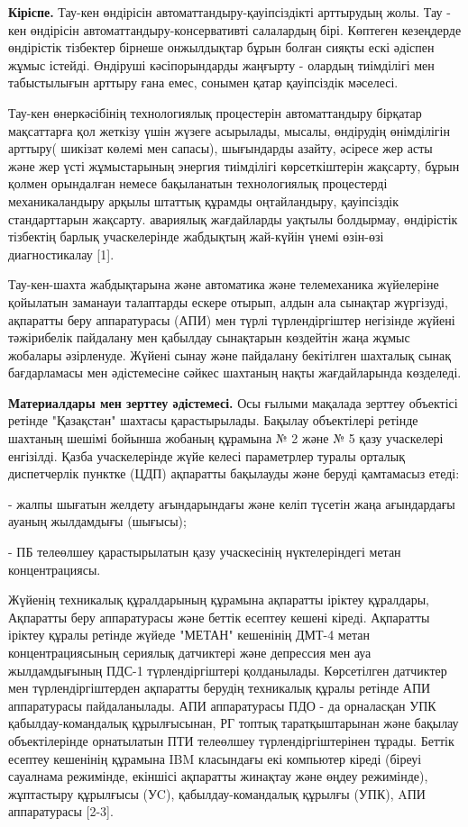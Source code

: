 \begin{multicols}{2}
{\bfseries Кіріспе.} Тау-кен өндірісін автоматтандыру-қауіпсіздікті
арттырудың жолы. Тау - кен өндірісін автоматтандыру-консервативті
салалардың бірі. Көптеген кезеңдерде өндірістік тізбектер бірнеше
онжылдықтар бұрын болған сияқты ескі әдіспен жұмыс істейді. Өндіруші
кәсіпорындарды жаңғырту - олардың тиімділігі мен табыстылығын арттыру
ғана емес, сонымен қатар қауіпсіздік мәселесі.

Тау-кен өнеркәсібінің технологиялық процестерін автоматтандыру бірқатар
мақсаттарға қол жеткізу үшін жүзеге асырылады, мысалы, өндірудің
өнімділігін арттыру( шикізат көлемі мен сапасы), шығындарды азайту,
әсіресе жер асты және жер үсті жұмыстарының энергия тиімділігі
көрсеткіштерін жақсарту, бұрын қолмен орындалған немесе бақыланатын
технологиялық процестерді механикаландыру арқылы штаттық құрамды
оңтайландыру, қауіпсіздік стандарттарын жақсарту. авариялық жағдайларды
уақтылы болдырмау, өндірістік тізбектің барлық учаскелерінде жабдықтың
жай-күйін үнемі өзін-өзі диагностикалау {[}1{]}.

Тау-кен-шахта жабдықтарына және автоматика және телемеханика жүйелеріне
қойылатын заманауи талаптарды ескере отырып, алдын ала сынақтар
жүргізуді, ақпаратты беру аппаратурасы (АПИ) мен түрлі түрлендіргіштер
негізінде жүйені тәжірибелік пайдалану мен қабылдау сынақтарын көздейтін
жаңа жұмыс жобалары әзірленуде. Жүйені сынау және пайдалану бекітілген
шахталық сынақ бағдарламасы мен әдістемесіне сәйкес шахтаның нақты
жағдайларында көзделеді.

{\bfseries Материалдары мен зерттеу әдістемесі.} Осы ғылыми мақалада
зерттеу объектісі ретінде "Қазақстан" шахтасы қарастырылады. Бақылау
объектілері ретінде шахтаның шешімі бойынша жобаның құрамына № 2 және №
5 қазу учаскелері енгізілді. Қазба учаскелерінде жүйе келесі параметрлер
туралы орталық диспетчерлік пунктке (ЦДП) ақпаратты бақылауды және
беруді қамтамасыз етеді:

- жалпы шығатын желдету ағындарындағы және келіп түсетін жаңа
ағындардағы ауаның жылдамдығы (шығысы);

- ПБ телеөлшеу қарастырылатын қазу учаскесінің нүктелеріндегі метан
концентрациясы.

Жүйенің техникалық құралдарының құрамына ақпаратты іріктеу құралдары,
Ақпаратты беру аппаратурасы және беттік есептеу кешені кіреді. Ақпаратты
іріктеу құралы ретінде жүйеде "МЕТАН" кешенінің ДМТ-4 метан
концентрациясының сериялық датчиктері және депрессия мен ауа
жылдамдығының ПДС-1 түрлендіргіштері қолданылады. Көрсетілген датчиктер
мен түрлендіргіштерден ақпаратты берудің техникалық құралы ретінде АПИ
аппаратурасы пайдаланылады. АПИ аппаратурасы ПДО - да орналасқан УПК
қабылдау-командалық құрылғысынан, РГ топтық таратқыштарынан және бақылау
объектілерінде орнатылатын ПТИ телеөлшеу түрлендіргіштерінен тұрады.
Беттік есептеу кешенінің құрамына IBM класындағы екі компьютер кіреді
(біреуі сауалнама режимінде, екіншісі ақпаратты жинақтау және өңдеу
режимінде), жұптастыру құрылғысы (УC), қабылдау-командалық құрылғы
(УПК), AПИ аппаратурасы {[}2-3{]}.


\end{multicols}
